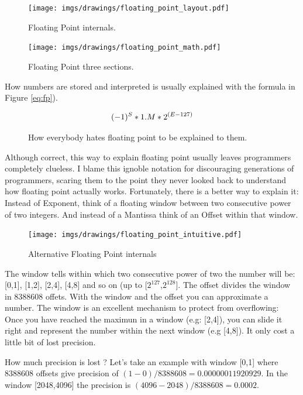 \documentclass[book.tex]{subfiles}
\begin{document}
\begin{figure}[H]
\centering
\texttt{[image: imgs/drawings/floating\_point\_layout.pdf]}
\caption{Floating Point internals.}
\end{figure}
  \bigskip



\begin{figure}[H]
\centering
\texttt{[image: imgs/drawings/floating\_point\_math.pdf]}
\caption{Floating Point three sections.}
\end{figure}
  \bigskip  


How numbers are stored and interpreted is usually explained with the formula in Figure \ref{eq:fp}).\

\begin{figure}[H]
\begin{equation}\label{eq:fp}
\large
(-1)^S * 1.M * 2^{(E-127)}
\end{equation}
 \caption{How everybody hates floating point to be explained to them.}
\end{figure}
\bigskip  

Although correct, this way to explain floating point usually leaves programmers completely clueless. I blame this ignoble notation for discouraging generations of programmers, scaring them to the point they never looked back to understand how floating point actually works. Fortunately, there is a better way to explain it: Instead of Exponent, think of a floating window between two consecutive power of two integers. And instead of a Mantissa think of an Offset within that window.\\ 
\par
  
\begin{figure}[H]
\centering
\texttt{[image: imgs/drawings/floating\_point\_intuitive.pdf]}
\caption{Alternative Floating Point internals}
\label{fig:fp_internals}
\end{figure}
  \bigskip  
The window tells within which two consecutive power of two the number will be: [0,1], [1,2], [2,4], [4,8] and so on (up to [$2^{127}$,$2^{128}$]. The offset divides the window in 8388608 offets. With the window and the offset you can approximate a number. The window is an excellent mechanism to protect from overflowing: Once you have reached the maximun in a window (e.g: [2,4]), you can slide it right and represent the number within the next window (e.g [4,8]). It only cost a little bit of lost precision.\\
\par {} How much precision is lost ? Let's take an example with window [0,1] where 8388608 offsets give precision of $(1-0)/8388608=0.00000011920929$. In the window [2048,4096] the precision is $ (4096-2048)/8388608=0.0002$.\\
\par
\end{document}
